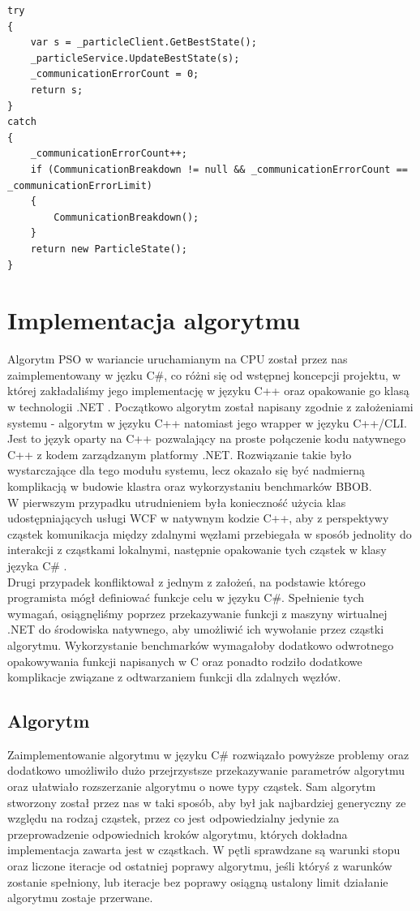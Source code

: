 \documentclass[12pt, twoside, openany, abstract=on]{report}
\theoremstyle{definition}
\begin{document}
\begin{lstlisting}[frame=single]
try
{
	var s = _particleClient.GetBestState();
	_particleService.UpdateBestState(s);
	_communicationErrorCount = 0;
	return s;
}
catch
{
	_communicationErrorCount++;
	if (CommunicationBreakdown != null && _communicationErrorCount == 						_communicationErrorLimit)
	{
		CommunicationBreakdown();		
	}
	return new ParticleState();
}
\end{lstlisting}

\section{Implementacja algorytmu}
Algorytm PSO w wariancie uruchamianym na CPU został przez nas zaimplementowany w jęzku C\#, co różni się od wstępnej koncepcji projektu, w której zakładaliśmy jego implementację w języku C++ oraz opakowanie go klasą w technologii .NET . Początkowo algorytm został napisany zgodnie z założeniami systemu - algorytm w języku C++ natomiast jego wrapper w języku C++/CLI. Jest to język oparty na C++ pozwalający na proste połączenie kodu natywnego C++ z kodem zarządzanym platformy .NET. Rozwiązanie takie było wystarczające dla tego modułu systemu, lecz okazało się być nadmierną komplikacją w budowie klastra oraz wykorzystaniu benchmarków BBOB.\\
W pierwszym przypadku utrudnieniem była konieczność użycia klas udostępniających usługi WCF w natywnym kodzie C++, aby  z perspektywy cząstek komunikacja między zdalnymi węzłami przebiegała w sposób jednolity do interakcji z cząstkami lokalnymi, następnie opakowanie tych cząstek w klasy języka C\# .\\
Drugi przypadek konfliktował z jednym z założeń, na podstawie którego programista mógł definiować funkcje celu w języku C\#. Spełnienie tych wymagań, osiągnęliśmy poprzez przekazywanie funkcji z maszyny wirtualnej .NET do środowiska natywnego, aby umożliwić ich wywołanie przez cząstki algorytmu. Wykorzystanie benchmarków wymagałoby dodatkowo odwrotnego opakowywania funkcji napisanych w C oraz ponadto rodziło dodatkowe komplikacje związane z odtwarzaniem funkcji dla zdalnych węzłów.

\subsection{Algorytm}
Zaimplementowanie algorytmu w języku C\# rozwiązało powyższe problemy oraz dodatkowo umożliwiło dużo przejrzystsze przekazywanie parametrów algorytmu oraz ułatwiało rozszerzanie algorytmu o nowe typy cząstek.
Sam algorytm stworzony został przez nas w taki sposób, aby był jak najbardziej generyczny ze względu na rodzaj cząstek, przez co jest odpowiedzialny jedynie za przeprowadzenie odpowiednich kroków algorytmu, których dokładna implementacja zawarta jest w cząstkach. W pętli sprawdzane są warunki stopu oraz liczone iteracje od ostatniej poprawy algorytmu, jeśli któryś z warunków zostanie spełniony, lub iteracje bez poprawy osiągną ustalony limit działanie algorytmu zostaje przerwane.
\end{document}
